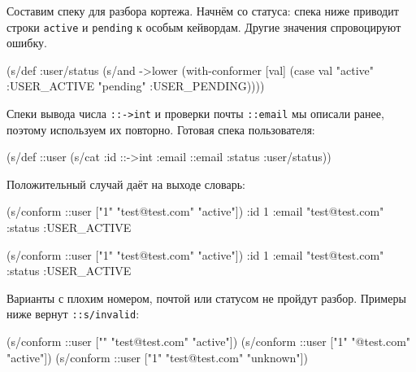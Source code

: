 Составим спеку для разбора кортежа. Начнём со статуса: спека ниже приводит
строки \verb|active| и \verb|pending| к особым кейвордам. Другие значения
спровоцируют ошибку.

\begin{english}
  \begin{clojure}
(s/def :user/status
  (s/and ->lower
         (with-conformer [val]
           (case val
             "active"  :USER_ACTIVE
             "pending" :USER_PENDING))))
  \end{clojure}
\end{english}

Спеки вывода числа \verb|::->int| и проверки почты \verb|::email| мы описали
ранее, поэтому используем их повторно. Готовая спека пользователя:

\begin{english}
  \begin{clojure}
(s/def ::user
  (s/cat :id ::->int
         :email ::email
         :status :user/status))
  \end{clojure}
\end{english}

\noindent
Положительный случай даёт на выходе словарь:

\ifx\DEVICETYPE\MOBILE

\begin{english}
  \begin{clojure}
(s/conform ::user
  ["1" "test@test.com" "active"])
{:id 1
 :email "test@test.com"
 :status :USER_ACTIVE}
  \end{clojure}
\end{english}

\else

\begin{english}
  \begin{clojure}
(s/conform ::user ["1" "test@test.com" "active"])
{:id 1
 :email "test@test.com"
 :status :USER_ACTIVE}
  \end{clojure}
\end{english}

\fi

Варианты с плохим номером, почтой или статусом не пройдут разбор. Примеры ниже
вернут \verb|::s/invalid|:

\ifx\DEVICETYPE\MOBILE

\begin{english}
  \begin{clojure}
(s/conform ::user
  ["" "test@test.com" "active"])
(s/conform ::user
  ["1" "@test.com" "active"])
(s/conform ::user
  ["1" "test@test.com" "unknown"])
  \end{clojure}
\end{english}

